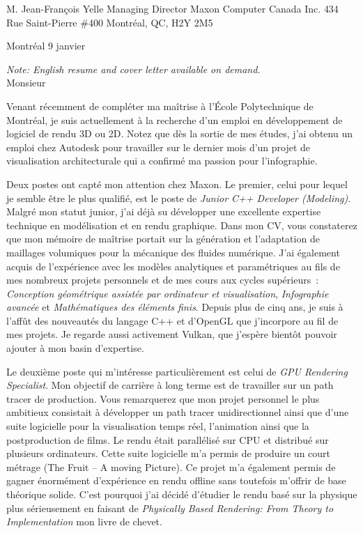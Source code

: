 \insertcvheader

\clrecipient
 {M. Jean-François Yelle}
 {Managing Director}
 {Maxon Computer Canada Inc.}
 {434 Rue Saint-Pierre \#400}
 {Montréal, QC, H2Y 2M5}
 
\cllocationdate
 {Montréal}
 {9 janvier}
 
\textit{Note: English resume and cover letter available on demand.}\\
 
\clgreeting
 {Monsieur}
 
Venant récemment de compléter ma maîtrise à l’École Polytechnique de Montréal, je suis actuellement à la recherche d’un emploi en développement de logiciel de rendu 3D ou 2D. Notez que dès la sortie de mes études, j'ai obtenu un emploi chez Autodesk pour travailler sur le dernier mois d'un projet de visualisation architecturale qui a confirmé ma passion pour l'infographie.

Deux postes ont capté mon attention chez Maxon. Le premier, celui pour lequel je semble être le plus qualifié, est le poste de \textit{Junior C++ Developer (Modeling)}. Malgré mon statut junior, j'ai déjà su développer une excellente expertise technique en modélisation et en rendu graphique. Dans mon CV, vous constaterez que mon mémoire de maîtrise portait sur la génération et l'adaptation de maillages volumiques pour la mécanique des fluides numérique. J'ai également acquis de l'expérience avec les modèles analytiques et paramétriques au fils de mes nombreux projets personnels et de mes cours aux cycles supérieurs~: \textit{Conception géométrique assistée par ordinateur et visualisation}, \textit{Infographie avancée} et \textit{Mathématiques des éléments finis}. Depuis plus de cinq ans, je suis à l'affût des nouveautés du langage C++ et d'OpenGL que j'incorpore au fil de mes projets. Je regarde aussi activement Vulkan, que j'espère bientôt pouvoir ajouter à mon basin d'expertise. 

Le deuxième poste qui m'intéresse particulièrement est celui de \textit{GPU Rendering Specialist}. Mon objectif de carrière à long terme est de travailler sur un path tracer de production. Vous remarquerez que mon projet personnel le plus ambitieux consistait à développer un path tracer unidirectionnel ainsi que d'une suite logicielle pour la visualisation temps réel, l'animation ainsi que la postproduction de films. Le rendu était parallélisé sur CPU et distribué sur plusieurs ordinateurs. Cette suite logicielle m'a permis de produire un court métrage (The Fruit -- A moving Picture). Ce projet m'a également permis de gagner énormément d'expérience en rendu offline sans toutefois m'offrir de base théorique solide. C'est pourquoi j'ai décidé d'étudier le rendu basé sur la physique plus sérieusement en faisant de \textit{Physically Based Rendering: From Theory to Implementation} mon livre de chevet.


